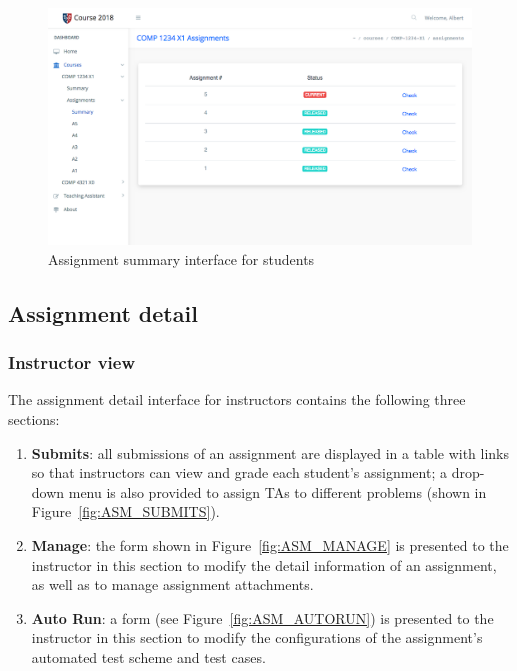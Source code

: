 \begin{figure}[H]
    \centering
        \includegraphics[width=1.0\textwidth]{figures/asm-summary-student}
    \caption{Assignment summary interface for students}
    \label{fig:ASM_SUMMARY_STUDENT}
\end{figure}

\subsection{Assignment detail}

\subsubsection{Instructor view}
The assignment detail interface for instructors contains the following three
sections:

\begin{enumerate}
    \item \textbf{Submits}: all submissions of an assignment are displayed
        in a table with links so that instructors can view and grade each
        student's assignment; a drop-down menu is also provided to assign TAs
        to different problems (shown in Figure~\ref{fig:ASM_SUBMITS}).
    \item \textbf{Manage}: the form shown in Figure~\ref{fig:ASM_MANAGE} is
        presented to the instructor in this section
        to modify the detail information of an assignment, as well as to
        manage assignment attachments.
    \item \textbf{Auto Run}: a form (see Figure~\ref{fig:ASM_AUTORUN}) is
        presented to the instructor in this
        section to modify the configurations of the assignment's automated
        test scheme and test cases.
\end{enumerate}

